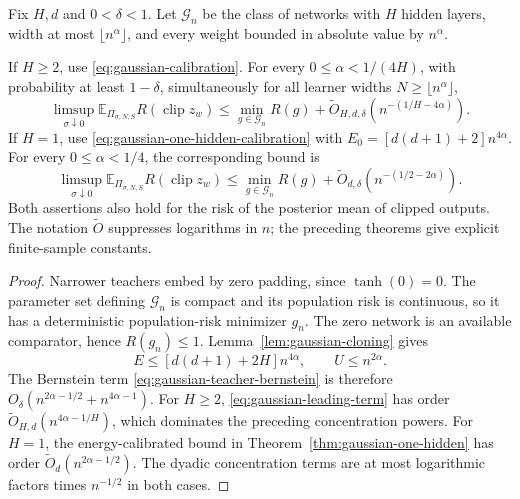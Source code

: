 \begin{corollary}
\label{cor:gaussian-growing-teachers}
Fix $H,d$ and $0<\delta<1$.  Let $\mathcal G_n$ be the class of networks
with $H$ hidden layers, width at most $\lfloor n^\alpha\rfloor$, and
every weight bounded in absolute value by $n^\alpha$.

If $H\geq2$, use \eqref{eq:gaussian-calibration}.  For every
$0\leq\alpha<1/(4H)$, with probability at least $1-\delta$,
simultaneously for all learner widths $N\geq\lfloor n^\alpha\rfloor$,
\begin{equation}
 \limsup_{\sigma\downarrow0}
  \mathbb E_{\Pi_{\sigma,N,S}}R(\operatorname{clip}z_w)
 \leq\min_{g\in\mathcal G_n}R(g)
       +\widetilde O_{H,d,\delta}(n^{-(1/H-4\alpha)}).
 \label{eq:gaussian-growing-deep}
\end{equation}
If $H=1$, use \eqref{eq:gaussian-one-hidden-calibration} with
$E_0=[d(d+1)+2]n^{4\alpha}$.  For every
$0\leq\alpha<1/4$, the corresponding bound is
\begin{equation}
 \limsup_{\sigma\downarrow0}
  \mathbb E_{\Pi_{\sigma,N,S}}R(\operatorname{clip}z_w)
 \leq\min_{g\in\mathcal G_n}R(g)
       +\widetilde O_{d,\delta}(n^{-(1/2-2\alpha)}).
 \label{eq:gaussian-growing-shallow}
\end{equation}
Both assertions also hold for the risk of the posterior mean of clipped
outputs.  The notation $\widetilde O$ suppresses logarithms in $n$;
the preceding theorems give explicit finite-sample constants.
\end{corollary}
\begin{proof}
Narrower teachers embed by zero padding, since $\tanh(0)=0$.
The parameter set defining $\mathcal G_n$ is compact and its population
risk is continuous, so it has a deterministic population-risk minimizer
$g_n$.  The zero network is an available comparator, hence $R(g_n)\leq1$.
Lemma~\ref{lem:gaussian-cloning} gives
\[
 E\leq[d(d+1)+2H]n^{4\alpha},\qquad U\leq n^{2\alpha}.
\]
The Bernstein term \eqref{eq:gaussian-teacher-bernstein} is therefore
$O_\delta(n^{2\alpha-1/2}+n^{4\alpha-1})$.
For $H\geq2$, \eqref{eq:gaussian-leading-term} has order
$\widetilde O_{H,d}(n^{4\alpha-1/H})$, which dominates the preceding
concentration powers.  For $H=1$, the energy-calibrated bound in
Theorem~\ref{thm:gaussian-one-hidden} has order
$\widetilde O_d(n^{2\alpha-1/2})$.  The dyadic concentration terms are
at most logarithmic factors times $n^{-1/2}$ in both cases.
\end{proof}

